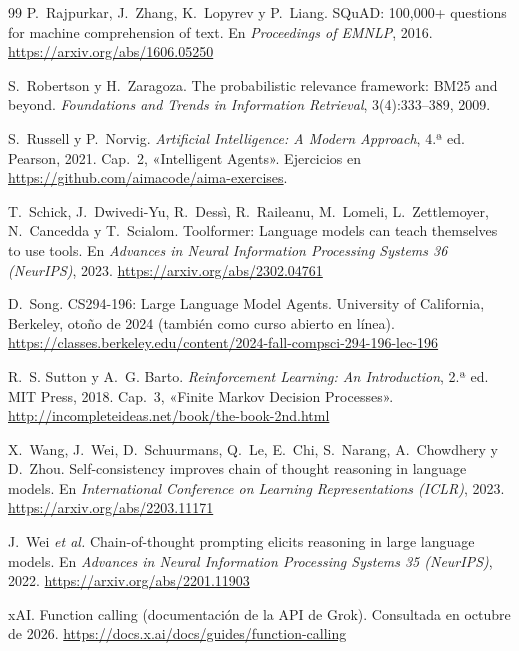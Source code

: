 \begin{thebibliography}{99}
P.~Rajpurkar, J.~Zhang, K.~Lopyrev y P.~Liang.
\newblock SQuAD: 100,000+ questions for machine comprehension of text.
\newblock En \emph{Proceedings of EMNLP}, 2016.
\newblock \url{https://arxiv.org/abs/1606.05250}

S.~Robertson y H.~Zaragoza.
\newblock The probabilistic relevance framework: BM25 and beyond.
\newblock \emph{Foundations and Trends in Information Retrieval}, 3(4):333--389, 2009.

S.~Russell y P.~Norvig.
\newblock \emph{Artificial Intelligence: A Modern Approach}, 4.ª ed.
\newblock Pearson, 2021. Cap.~2, «Intelligent Agents». Ejercicios en \url{https://github.com/aimacode/aima-exercises}.

T.~Schick, J.~Dwivedi-Yu, R.~Dessì, R.~Raileanu, M.~Lomeli, L.~Zettlemoyer, N.~Cancedda y T.~Scialom.
\newblock Toolformer: Language models can teach themselves to use tools.
\newblock En \emph{Advances in Neural Information Processing Systems 36 (NeurIPS)}, 2023.
\newblock \url{https://arxiv.org/abs/2302.04761}

D.~Song.
\newblock CS294-196: Large Language Model Agents.
\newblock University of California, Berkeley, otoño de 2024 (también como curso abierto en línea).
\newblock \url{https://classes.berkeley.edu/content/2024-fall-compsci-294-196-lec-196}

R.~S. Sutton y A.~G. Barto.
\newblock \emph{Reinforcement Learning: An Introduction}, 2.ª ed.
\newblock MIT Press, 2018. Cap.~3, «Finite Markov Decision Processes».
\newblock \url{http://incompleteideas.net/book/the-book-2nd.html}

X.~Wang, J.~Wei, D.~Schuurmans, Q.~Le, E.~Chi, S.~Narang, A.~Chowdhery y D.~Zhou.
\newblock Self-consistency improves chain of thought reasoning in language models.
\newblock En \emph{International Conference on Learning Representations (ICLR)}, 2023.
\newblock \url{https://arxiv.org/abs/2203.11171}

J.~Wei \emph{et al.}
\newblock Chain-of-thought prompting elicits reasoning in large language models.
\newblock En \emph{Advances in Neural Information Processing Systems 35 (NeurIPS)}, 2022.
\newblock \url{https://arxiv.org/abs/2201.11903}

xAI.
\newblock Function calling (documentación de la API de Grok).
\newblock Consultada en octubre de 2026.
\newblock \url{https://docs.x.ai/docs/guides/function-calling}


\end{thebibliography}

